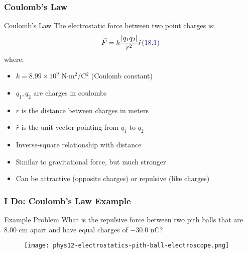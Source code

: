 \documentclass{beamer}
\newcommand{\highlight}[1]{\textcolor{ds9red}{#1}}
\newcommand{\eqnlabel}[1]{\textcolor{ds9blue}{(#1)}}
\begin{document}
\begin{frame}
    \frametitle{Coulomb's Law}
    
    \begin{block}{Coulomb's Law}
        The electrostatic force between two point charges is:
        \begin{equation}
            \vec{F} = k\frac{|q_1 q_2|}{r^2}\hat{r} \eqnlabel{18.1}
        \end{equation}
        where:
        \begin{itemize}
            \item $k = 8.99 \times 10^9$ N$\cdot$m$^2$/C$^2$ (Coulomb constant)
            \item $q_1, q_2$ are charges in coulombs
            \item $r$ is the distance between charges in meters
            \item $\hat{r}$ is the unit vector pointing from $q_1$ to $q_2$
        \end{itemize}
    \end{block}
    
    \begin{itemize}
        \item \highlight{Inverse-square} relationship with distance
        \item Similar to gravitational force, but \highlight{much stronger}
        \item Can be \highlight{attractive} (opposite charges) or \highlight{repulsive} (like charges)
    \end{itemize}
\end{frame}

\begin{frame}
    \frametitle{I Do: Coulomb's Law Example}
    
    \begin{exampleblock}{Example Problem}
        What is the repulsive force between two pith balls that are 8.00 cm apart and have equal charges of $-30.0$ nC?
    \end{exampleblock}
    \pause

    \begin{figure}
        \centering
        \texttt{[image: phys12-electrostatics-pith-ball-electroscope.png]}
    \end{figure}
\end{frame}
        
\end{document}
